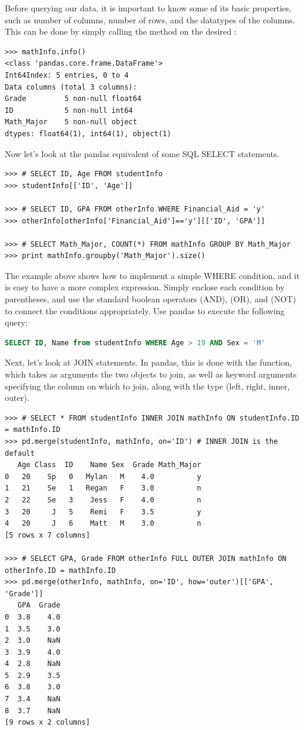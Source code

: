 Before querying our data, it is important to know some of its basic properties, such as
number of columns, number of rows, and the datatypes of the columns. This can be done
by simply calling the  method on the desired :
\begin{lstlisting}
>>> mathInfo.info()
<class 'pandas.core.frame.DataFrame'>
Int64Index: 5 entries, 0 to 4
Data columns (total 3 columns):
Grade         5 non-null float64
ID            5 non-null int64
Math_Major    5 non-null object
dtypes: float64(1), int64(1), object(1)
\end{lstlisting}

Now let's look at the pandas equivalent of some SQL SELECT statements.
\begin{lstlisting}
>>> # SELECT ID, Age FROM studentInfo
>>> studentInfo[['ID', 'Age']]

>>> # SELECT ID, GPA FROM otherInfo WHERE Financial_Aid = 'y'
>>> otherInfo[otherInfo['Financial_Aid']=='y'][['ID', 'GPA']]

>>> # SELECT Math_Major, COUNT(*) FROM mathInfo GROUP BY Math_Major
>>> print mathInfo.groupby('Math_Major').size()
\end{lstlisting}

\begin{problem}
The example above shows how to implement a simple WHERE condition, and it is easy
to have a more complex expression. Simply enclose each condition by parentheses,
and use the standard boolean operators \li{\&} (AND), \li{\|} (OR), and \li{\~} (NOT) to
connect the conditions appropriately. Use pandas to execute the following query:
\begin{lstlisting}[language=SQL]
SELECT ID, Name from studentInfo WHERE Age > 19 AND Sex = 'M'
\end{lstlisting}
\end{problem}

Next, let's look at JOIN statements. In pandas, this is done with the  function,
which takes as arguments the two  objects to join, as well as keyword arguments specifying
the column on which to join, along with the type (left, right, inner, outer).

\begin{lstlisting}
>>> # SELECT * FROM studentInfo INNER JOIN mathInfo ON studentInfo.ID = mathInfo.ID
>>> pd.merge(studentInfo, mathInfo, on='ID') # INNER JOIN is the default
   Age Class  ID    Name Sex  Grade Math_Major
0   20    Sp   0   Mylan   M    4.0          y
1   21    Se   1   Regan   F    3.0          n
2   22    Se   3    Jess   F    4.0          n
3   20     J   5    Remi   F    3.5          y
4   20     J   6    Matt   M    3.0          n
[5 rows x 7 columns]

>>> # SELECT GPA, Grade FROM otherInfo FULL OUTER JOIN mathInfo ON otherInfo.ID = mathInfo.ID
>>> pd.merge(otherInfo, mathInfo, on='ID', how='outer')[['GPA', 'Grade']]
   GPA  Grade
0  3.8    4.0
1  3.5    3.0
2  3.0    NaN
3  3.9    4.0
4  2.8    NaN
5  2.9    3.5
6  3.8    3.0
7  3.4    NaN
8  3.7    NaN
[9 rows x 2 columns]
\end{lstlisting}

